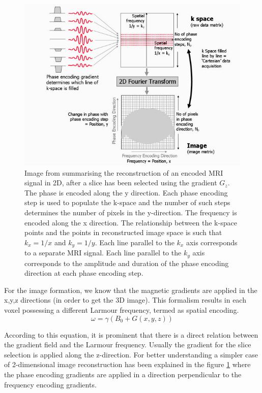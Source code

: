 \documentclass[msthesis.tex]{subfiles}
\begin{document}
\begin{figure}
    \centering
    \includegraphics[width=\textwidth]{images/img_reconstruction.jpg}
    \caption{Image from \cite{MRIrecon} summarising the reconstruction of an encoded MRI signal in 2D, after a slice has been selected using the gradient $G_z$. The phase is encoded along the y direction. Each phase encoding step is used to populate the k-space and the number of such steps determines the number of pixels in the y-direction. The frequency is encoded along the x direction. The relationship between the k-space points and the points in reconstructed image space is such that $k_x =1/x$ and $k_y= 1/y$. Each line parallel to the $k_x$ axis corresponds to a separate MRI signal. Each line parallel to the $k_y$ axis corresponds to the amplitude and duration of the phase encoding direction at each phase encoding step.}
    \label{fig:mri_img}
\end{figure}

For the image formation, we know that the magnetic gradients are applied in the x,y,z directions (in order to get the 3D image). This formalism results in each voxel possessing a different Larmour frequency, termed as spatial encoding. 
\begin{equation}
        \label{eq:larmour_grad}
          \omega = \gamma(B_0 + G(x, y, z))
     \end{equation}
       
According to this equation, it is prominent that there is a direct relation between the gradient field and the Larmour frequency. Usually the gradient for the slice selection is applied along the z-direction. For better understanding a simpler case of 2-dimensional image reconstruction has been explained in the figure \ref{fig:mri_img} where the phase encoding gradients are applied in a direction perpendicular to the frequency encoding gradients.
\end{document}

